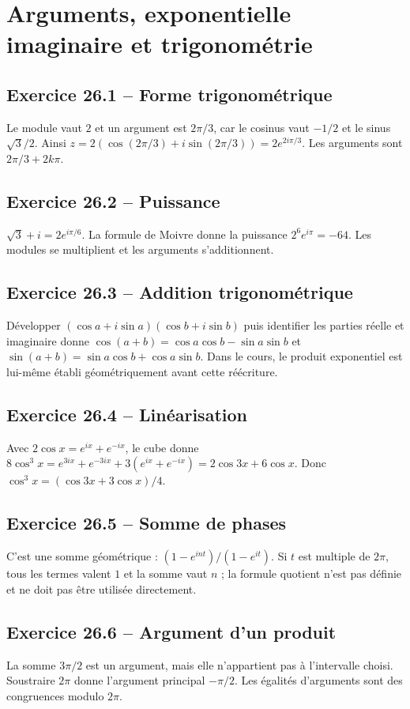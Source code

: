 \chapter{Arguments, exponentielle imaginaire et trigonométrie}
\section*{Exercice 26.1 -- Forme trigonométrique}
Le module vaut $2$ et un argument est $2\pi/3$, car le cosinus vaut $-1/2$ et le sinus $\sqrt3/2$. Ainsi $z=2(\cos(2\pi/3)+i\sin(2\pi/3))=2e^{2i\pi/3}$. Les arguments sont $2\pi/3+2k\pi$.

\section*{Exercice 26.2 -- Puissance}
$\sqrt3+i=2e^{i\pi/6}$. La formule de Moivre donne la puissance $2^6e^{i\pi}=-64$. Les modules se multiplient et les arguments s'additionnent.

\section*{Exercice 26.3 -- Addition trigonométrique}
Développer $(\cos a+i\sin a)(\cos b+i\sin b)$ puis identifier les parties réelle et imaginaire donne $\cos(a+b)=\cos a\cos b-\sin a\sin b$ et $\sin(a+b)=\sin a\cos b+\cos a\sin b$. Dans le cours, le produit exponentiel est lui-même établi géométriquement avant cette réécriture.

\section*{Exercice 26.4 -- Linéarisation}
Avec $2\cos x=e^{i x}+e^{-i x}$, le cube donne $8\cos^3x=e^{3i x}+e^{-3i x}+3(e^{i x}+e^{-i x})=2\cos3x+6\cos x$. Donc $\cos^3x=(\cos3x+3\cos x)/4$.

\section*{Exercice 26.5 -- Somme de phases}
C'est une somme géométrique : $(1-e^{i nt})/(1-e^{i t})$. Si $t$ est multiple de $2\pi$, tous les termes valent $1$ et la somme vaut $n$ ; la formule quotient n'est pas définie et ne doit pas être utilisée directement.

\section*{Exercice 26.6 -- Argument d’un produit}
La somme $3\pi/2$ est un argument, mais elle n'appartient pas à l'intervalle choisi. Soustraire $2\pi$ donne l'argument principal $-\pi/2$. Les égalités d'arguments sont des congruences modulo $2\pi$.
